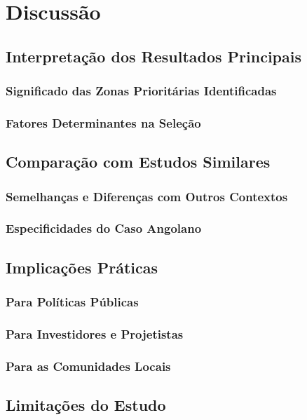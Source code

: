 \documentclass[12pt, a4paper]{article}
\begin{document}
\section{Discussão}
\subsection{Interpretação dos Resultados Principais}
\subsubsection{Significado das Zonas Prioritárias Identificadas}
\subsubsection{Fatores Determinantes na Seleção}

\subsection{Comparação com Estudos Similares}
\subsubsection{Semelhanças e Diferenças com Outros Contextos}
\subsubsection{Especificidades do Caso Angolano}

\subsection{Implicações Práticas}
\subsubsection{Para Políticas Públicas}
\subsubsection{Para Investidores e Projetistas}
\subsubsection{Para as Comunidades Locais}

\subsection{Limitações do Estudo}
\end{document}
